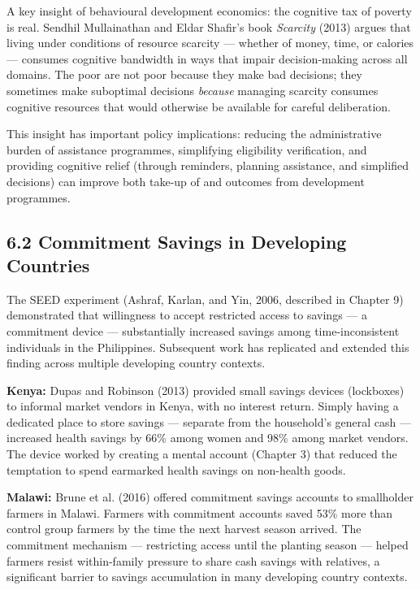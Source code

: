\documentclass[12pt, letterpaper]{article}
\begin{document}
A key insight of behavioural development economics: the cognitive tax of poverty is real. Sendhil Mullainathan and Eldar Shafir's book \textit{Scarcity} (2013) argues that living under conditions of resource scarcity --- whether of money, time, or calories --- consumes cognitive bandwidth in ways that impair decision-making across all domains. The poor are not poor because they make bad decisions; they sometimes make suboptimal decisions \textit{because} managing scarcity consumes cognitive resources that would otherwise be available for careful deliberation.

This insight has important policy implications: reducing the administrative burden of assistance programmes, simplifying eligibility verification, and providing cognitive relief (through reminders, planning assistance, and simplified decisions) can improve both take-up of and outcomes from development programmes.


\subsection{6.2 Commitment Savings in Developing Countries}


The SEED experiment (Ashraf, Karlan, and Yin, 2006, described in Chapter 9) demonstrated that willingness to accept restricted access to savings --- a commitment device --- substantially increased savings among time-inconsistent individuals in the Philippines. Subsequent work has replicated and extended this finding across multiple developing country contexts.

\textbf{Kenya:} Dupas and Robinson (2013) provided small savings devices (lockboxes) to informal market vendors in Kenya, with no interest return. Simply having a dedicated place to store savings --- separate from the household's general cash --- increased health savings by 66\% among women and 98\% among market vendors. The device worked by creating a mental account (Chapter 3) that reduced the temptation to spend earmarked health savings on non-health goods.

\textbf{Malawi:} Brune et al. (2016) offered commitment savings accounts to smallholder farmers in Malawi. Farmers with commitment accounts saved 53\% more than control group farmers by the time the next harvest season arrived. The commitment mechanism --- restricting access until the planting season --- helped farmers resist within-family pressure to share cash savings with relatives, a significant barrier to savings accumulation in many developing country contexts.
\end{document}
